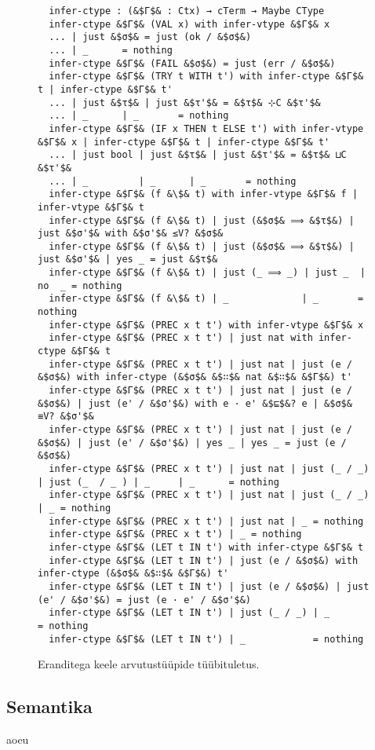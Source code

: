 \documentclass[a4paper,12pt]{article}
\begin{document}
\begin{figure}
  \begin{lstlisting}
  infer-ctype : (&$Γ$& : Ctx) → cTerm → Maybe CType
  infer-ctype &$Γ$& (VAL x) with infer-vtype &$Γ$& x
  ... | just &$σ$& = just (ok / &$σ$&)
  ... | _      = nothing
  infer-ctype &$Γ$& (FAIL &$σ$&) = just (err / &$σ$&)
  infer-ctype &$Γ$& (TRY t WITH t') with infer-ctype &$Γ$& t | infer-ctype &$Γ$& t'
  ... | just &$τ$& | just &$τ'$& = &$τ$& ⊹C &$τ'$&
  ... | _      | _       = nothing
  infer-ctype &$Γ$& (IF x THEN t ELSE t') with infer-vtype &$Γ$& x | infer-ctype &$Γ$& t | infer-ctype &$Γ$& t'
  ... | just bool | just &$τ$& | just &$τ'$& = &$τ$& ⊔C &$τ'$&
  ... | _         | _      | _       = nothing
  infer-ctype &$Γ$& (f &\$& t) with infer-vtype &$Γ$& f | infer-vtype &$Γ$& t
  infer-ctype &$Γ$& (f &\$& t) | just (&$σ$& ⟹ &$τ$&) | just &$σ'$& with &$σ'$& ≤V? &$σ$&
  infer-ctype &$Γ$& (f &\$& t) | just (&$σ$& ⟹ &$τ$&) | just &$σ'$& | yes _ = just &$τ$&
  infer-ctype &$Γ$& (f &\$& t) | just (_ ⟹ _) | just _  | no  _ = nothing
  infer-ctype &$Γ$& (f &\$& t) | _             | _       = nothing
  infer-ctype &$Γ$& (PREC x t t') with infer-vtype &$Γ$& x
  infer-ctype &$Γ$& (PREC x t t') | just nat with infer-ctype &$Γ$& t
  infer-ctype &$Γ$& (PREC x t t') | just nat | just (e / &$σ$&) with infer-ctype (&$σ$& &$∷$& nat &$∷$& &$Γ$&) t'
  infer-ctype &$Γ$& (PREC x t t') | just nat | just (e / &$σ$&) | just (e' / &$σ'$&) with e · e' &$⊑$&? e | &$σ$& ≡V? &$σ'$&
  infer-ctype &$Γ$& (PREC x t t') | just nat | just (e / &$σ$&) | just (e' / &$σ'$&) | yes _ | yes _ = just (e / &$σ$&)
  infer-ctype &$Γ$& (PREC x t t') | just nat | just (_ / _) | just (_  / _ ) | _     | _      = nothing
  infer-ctype &$Γ$& (PREC x t t') | just nat | just (_ / _) | _ = nothing
  infer-ctype &$Γ$& (PREC x t t') | just nat | _ = nothing
  infer-ctype &$Γ$& (PREC x t t') | _ = nothing
  infer-ctype &$Γ$& (LET t IN t') with infer-ctype &$Γ$& t 
  infer-ctype &$Γ$& (LET t IN t') | just (e / &$σ$&) with infer-ctype (&$σ$& &$∷$& &$Γ$&) t'
  infer-ctype &$Γ$& (LET t IN t') | just (e / &$σ$&) | just (e' / &$σ'$&) = just (e · e' / &$σ'$&)
  infer-ctype &$Γ$& (LET t IN t') | just (_ / _) | _              = nothing
  infer-ctype &$Γ$& (LET t IN t') | _            = nothing
  \end{lstlisting}
  \caption{Eranditega keele arvutustüüpide tüübituletus.}
  \label{fig:exc.infer-ctype}
\end{figure}


\subsection{Semantika}
aoeu
\end{document}

